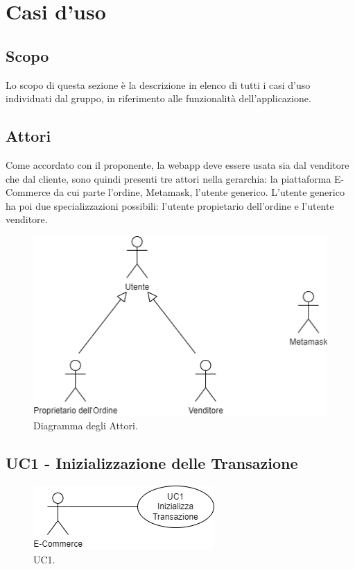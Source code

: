 \section{Casi d'uso}

\subsection{Scopo}
Lo scopo di questa sezione è la descrizione in elenco di tutti i casi d’uso individuati dal gruppo, in
riferimento alle funzionalità dell’applicazione.

\subsection{Attori}
Come accordato con il proponente, la webapp deve essere usata sia dal venditore che dal cliente,
sono quindi presenti tre attori nella gerarchia: la piattaforma E-Commerce da cui parte l'ordine, Metamask\glo, l'utente generico.
L'utente generico ha poi due specializzazioni possibili: l'utente propietario dell'ordine e l'utente venditore.

\begin{figure}[H]
    \centering
    \includegraphics[scale=0.7]{immagini/UseCases-Attori.png}
    \caption{Diagramma degli Attori.}
  \end{figure}

\subsection{UC1 - Inizializzazione delle Transazione}

\begin{figure}[H]
    \centering
    \includegraphics[scale=0.7]{immagini/UseCases-UC1.png}
    \caption{UC1.}
  \end{figure}

